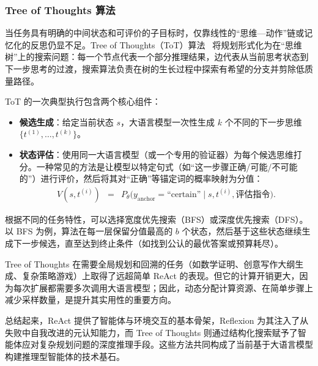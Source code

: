 \subsubsection{Tree of Thoughts 算法}

当任务具有明确的中间状态和可评价的子目标时，仅靠线性的“思维—动作”链或记忆化的反思仍显不足。Tree of Thoughts（ToT）算法~\cite{yao-etal:2023tree} 将规划形式化为在“思维树”上的搜索问题：每一个节点代表一个部分推理结果，边代表从当前思考状态到下一步思考的过渡，搜索算法负责在树的生长过程中探索有希望的分支并剪除低质量路径。

ToT 的一次典型执行包含两个核心组件：

\begin{itemize}
\item \textbf{候选生成}：给定当前状态 $s$，大语言模型一次性生成 $k$ 个不同的下一步思维 $\{t^{(1)}, \dots, t^{(k)}\}$。
\item \textbf{状态评估}：使用同一大语言模型（或一个专用的验证器）为每个候选思维打分。一种常见的方法是让模型以特定句式（如“这一步骤正确/可能/不可能的”）进行评价，然后将其对“正确”等锚定词的概率映射为分值：
\begin{eqnarray}
V(s, t^{(i)}) &=& P_\theta\bigl(y_{\mathrm{anchor}} = \text{``certain''} \mid s, t^{(i)}, \text{评估指令}\bigr).
\end{eqnarray}
\end{itemize}

根据不同的任务特性，可以选择宽度优先搜索（BFS）或深度优先搜索（DFS）。以 BFS 为例，算法在每一层保留分值最高的 $b$ 个状态，然后基于这些状态继续生成下一步候选，直至达到终止条件（如找到公认的最优答案或预算耗尽）。

Tree of Thoughts 在需要全局规划和回溯的任务（如数学证明、创意写作大纲生成、复杂策略游戏）上取得了远超简单 ReAct 的表现。但它的计算开销更大，因为每次扩展都需要多次调用大语言模型；因此，动态分配计算资源、在简单步骤上减少采样数量，是提升其实用性的重要方向。

\vspace{0.3cm}
总结起来，ReAct 提供了智能体与环境交互的基本骨架，Reflexion 为其注入了从失败中自我改进的元认知能力，而 Tree of Thoughts 则通过结构化搜索赋予了智能体应对复杂规划问题的深度推理手段。这些方法共同构成了当前基于大语言模型构建推理型智能体的技术基石。